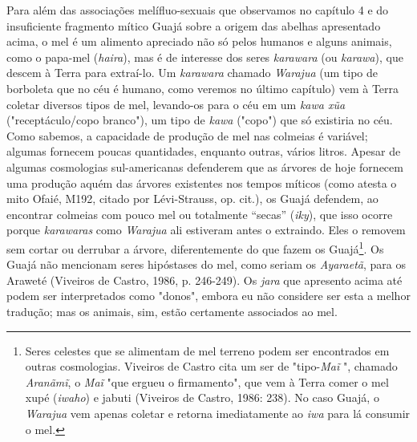 Para além das associações melífluo-sexuais que observamos no capítulo 4
e do insuficiente fragmento mítico Guajá sobre a origem das abelhas
apresentado acima, o mel é um alimento apreciado não só pelos humanos e
alguns animais, como o papa-mel (\emph{haira}), mas é de interesse dos
seres \emph{karawara} (ou \emph{karawa}), que descem à Terra para
extraí-lo. Um \emph{karawara} chamado \emph{Warajua} (um tipo de
borboleta que no céu é humano, como veremos no último capítulo) vem à
Terra coletar diversos tipos de mel, levando-os para o céu em um
\emph{kawa xũa} ("receptáculo/copo branco"), um tipo de \emph{kawa}
("copo") que só existiria no céu. Como sabemos, a capacidade de produção
de mel nas colmeias é variável; algumas fornecem poucas quantidades,
enquanto outras, vários litros. Apesar de algumas cosmologias
sul-americanas defenderem que as árvores de hoje fornecem uma produção
aquém das árvores existentes nos tempos míticos (como atesta o mito
Ofaié, M192, citado por Lévi-Strauss, op. cit.), os Guajá defendem, ao
encontrar colmeias com pouco mel ou totalmente ``secas'' (\emph{iky}),
que isso ocorre porque \emph{karawaras} como \emph{Warajua} ali
estiveram antes o extraindo. Eles o removem sem cortar ou derrubar a
árvore, diferentemente do que fazem os Guajá\footnote{Seres celestes que
  se alimentam de mel terreno podem ser encontrados em outras
  cosmologias. Viveiros de Castro cita um ser de "tipo-\emph{Maĩ} ",
  chamado \emph{Aranãmĩ}, o \emph{Maĩ} "que ergueu o firmamento", que
  vem à Terra comer o mel xupé (\emph{iwaho}) e jabuti (Viveiros de
  Castro, 1986: 238). No caso Guajá, o \emph{Warajua} vem apenas coletar
  e retorna imediatamente ao \emph{iwa} para lá consumir o mel.}. Os
Guajá não mencionam seres hipóstases do mel, como seriam os
\emph{Ayaraetã}, para os Araweté (Viveiros de Castro, 1986, p. 246-249).
Os \emph{jara} que apresento acima até podem ser interpretados como
"donos", embora eu não considere ser esta a melhor tradução; mas os
animais, sim, estão certamente associados ao mel.

